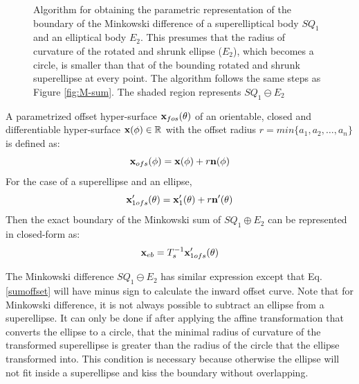 \documentclass[]{article}
\begin{document}
\begin{figure}[!t]
	\hspace{0.1in}
	\caption{Algorithm for obtaining the parametric representation of the boundary of the Minkowski difference of a superelliptical body $SQ_1$ and an elliptical body $E_2$. This presumes that the radius of curvature of the rotated and shrunk ellipse ($E_2$), which becomes a circle, is smaller than that of the bounding rotated and shrunk superellipse at every point. The algorithm follows the same steps as Figure \ref{fig:M-sum}. The shaded region represents $SQ_1 \ominus E_2$}
	\label{fig:M-diff}
\end{figure}

A parametrized offset hyper-surface ${\bf x}_{fos}(\theta)$ of an orientable, closed and differentiable hyper-surface ${\bf x}(\phi) \in \mathbb{R}$ with the offset radius $r = min\{a_1, a_2, \dots, a_n\}$ is defined as:
\begin{equation}
{\bf x}_{ofs}(\phi) = {\bf x}(\phi) + r{\bf n}(\phi)
\end{equation}
For the case of a superellipse and an ellipse,
\begin{equation}
{\bf x}_{1ofs}^{\prime}(\theta) = {\bf x}_1^{\prime}(\theta) + r{\bf n}^{\prime}(\theta)
\label{sumoffset}
\end{equation}
Then the exact boundary of the Minkowski sum of $SQ_1 \oplus E_2$ can be represented in closed-form as:
\begin{equation}
{\bf x}_{eb} = T_s^{-1}{\bf x}_{1ofs}^{\prime}(\theta)
\end{equation}

The Minkowski difference $SQ_1 \ominus E_2$ has similar expression except that Eq.\eqref{sumoffset} will have minus sign to calculate the inward offset curve. Note that for Minkowski difference, it is not always possible to subtract an ellipse from a superellipse. It can only be done if after applying the affine transformation that converts the ellipse to a circle, that the minimal radius of curvature of the transformed superellipse is greater than the radius of the circle that the ellipse transformed into. This condition is necessary because otherwise the ellipse will not fit inside a superellipse and kiss the boundary without overlapping. 
\end{document}
